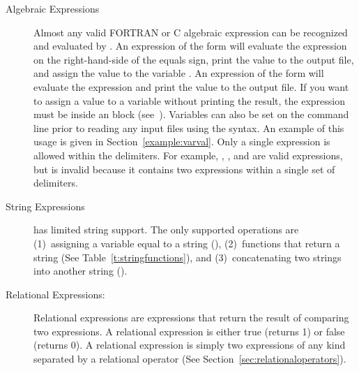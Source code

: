\begin{description}
\item[Algebraic Expressions] Almost any valid FORTRAN or C algebraic expression 
can be recognized and evaluated by \aprepro{}. An expression of the
form
 will evaluate the expression on the right-hand-side 
of the equals sign, print the value to the output file, and assign the
value to the variable . An expression of the form
 will evaluate the expression and print the value to
the output file. If you want to assign a value to a variable without
printing the result, the expression must be inside an
 block (see~\pageref{echo}). Variables can
also be set on the command line prior to reading any input files using
the  syntax. An example of this usage is given in
Section~\ref{example:varval}. Only a single expression is allowed
within the \cmd{\{ \}} delimiters. For example,
, ,
and are valid expressions, but 
is invalid because it contains two expressions within a single set of
delimiters.

\item[String Expressions] \aprepro{} has limited string support. 
The only supported operations are (1)~assigning a variable equal to a
string (), (2)~functions
that return a string (See Table~\ref{t:stringfunctions}), and (3)~concatenating two strings into another
string ().

\item[Relational Expressions:] Relational expressions are expressions that 
return the result of comparing two expressions. A relational
expression is either true (returns 1) or false (returns 0). A
relational expression is simply two expressions of any kind separated
by a relational operator (See Section~\ref{sec:relationaloperators}).


\end{description}
